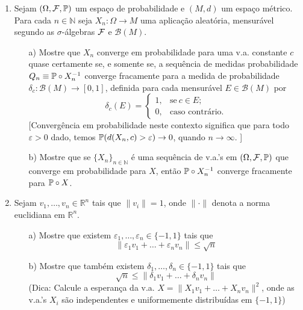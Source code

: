\begin{enumerate}[leftmargin=*]
\item 
Sejam $(\Omega,\F,\P)$ um espaço de probabilidade 
e $(M,d)$ um espaço métrico. 
Para cada $n\in\mathbb{N}$ seja $X_n:\Omega\to M$ uma 
aplicação aleatória, mensurável segundo as $\sigma$-álgebras
$\F$ e $\mathscr{B}(M)$.  
\begin{itemize}
	\item[a)] Mostre que $X_n$ converge em probabilidade
	para uma v.a. constante $c$ quase certamente se, e somente se,
	a sequência de medidas probabilidade $Q_n\equiv \P\circ X_n^{-1}$
	converge fracamente para a medida de probabilidade 
	$\delta_c:\mathscr{B}(M)\to [0,1]$, definida para cada 
	mensurável $E\in\mathscr{B}(M)$ por 
	\[
		\delta_c(E) 
		=
		\begin{cases}
		1,&\text{se}\ c\in E;
		\\
		0,&\text{caso contrário.}
		\end{cases}
	\] 
	[Convergência em probabilidade neste contexto significa 
	que para todo $\varepsilon>0$ dado, 
	temos $\P(d(X_n,c)>\varepsilon)\to 0$, quando $n\to\infty$. 
	]
	
	
	\item[b)]
	Mostre que se $\{X_n\}_{n\in\mathbb{N}}$ é uma
	sequência de v.a.'s em $(\Omega,\F,\P)$ que converge em probabilidade 
	para $X$, 
	então $\P\circ X_n^{-1}$ converge fracamente para $\P\circ X$.
	
	
\end{itemize}






	\item
	Sejam $v_1,\ldots,v_n\in \mathbb{R}^n$ tais que 
	$\|v_i\|=1$, 
	onde 
	$\|\cdot\|$ denota a norma euclidiana em $\mathbb{R}^n$.
	\begin{itemize}
	\item[a)]
	Mostre que existem $\varepsilon_1,\ldots,\varepsilon_n\in\{-1,1\}$
	tais que
	\[ 
		\|\varepsilon_1 v_1 +\ldots+\varepsilon_n v_n\|\leq \sqrt{n}
	\] 
	
	\item[b)] 
	Mostre que também existem $\delta_1,\ldots,\delta_n\in\{-1,1\}$
	tais que
	\[
		\sqrt{n} \leq \|\delta_1 v_1 +\ldots+\delta_n v_n\|
	\]
	(Dica: Calcule a esperança da v.a. $X=\|X_1v_1+\ldots+X_n v_n\|^2$, 
	onde as v.a.'s $X_i$ são independentes e uniformemente distribuídas 
	em $\{-1,1\}$)
	\end{itemize}
	






\end{enumerate}
